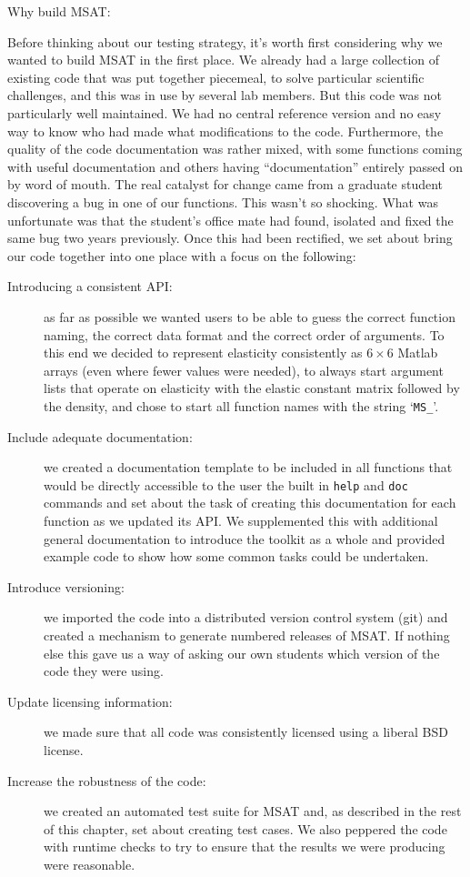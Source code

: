\documentclass[11pt, oneside]{article}   	%
\begin{document}
Why build MSAT:

Before thinking about our testing strategy, it's worth first considering why
we wanted to build MSAT in the first place. We already had a large collection 
of existing code that was put together piecemeal, to solve particular scientific
challenges, and this was in use by several lab members. But this code was not
particularly well maintained. We had no central reference version and no easy
way to know who had made what modifications to the code. Furthermore, the 
quality of the code documentation was rather mixed, with some functions coming
with useful documentation and others having ``documentation'' entirely passed on
by word of mouth. The real catalyst for change came from a graduate student 
discovering a bug in one of our functions. This wasn't so shocking. What was 
unfortunate was that the student's office mate had found, isolated and fixed the
same bug two years previously. Once this had been rectified, we set about 
bring our code together into one place with a focus on the following:
\begin{description}

\item[Introducing a consistent API:] as far as possible we wanted users 
to be able to guess the correct function naming, the correct data format 
and the correct order of arguments. To this end we decided to represent 
elasticity consistently as $6\times6$ Matlab arrays (even where fewer
values were needed), to always start argument lists that operate on 
elasticity with the elastic constant matrix followed by the density, and
chose to start all function names with the string `\texttt{MS\_}'.

\item[Include adequate documentation:] we created a documentation template
to be included in all functions that would be directly accessible to the user
the built in \texttt{help} and \texttt{doc} commands and set about the task of
creating this documentation for each function as we updated its API. We 
supplemented this with additional general documentation to introduce 
the toolkit as a whole and provided example code to show how
some common tasks could be undertaken.

\item[Introduce versioning:] we imported the code into a distributed version
control system (git) and created a mechanism to generate numbered 
releases of MSAT. If nothing else this gave us a way of asking our own students
which version of the code they were using.

\item[Update licensing information:] we made sure that all code was consistently 
licensed using a liberal BSD license.

\item[Increase the robustness of the code:] we created an automated test suite 
for MSAT and, as described in the rest of this chapter, set about creating test 
cases. We also peppered the code with runtime checks to try to ensure that
the results we were producing were reasonable. 

\end{description}
\end{document}
